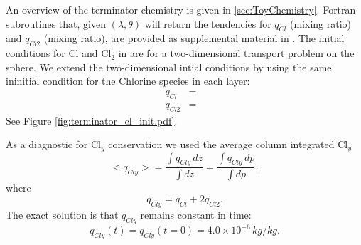 \documentclass[times,doublespace]{fldauth}
\begin{document}
An overview of the terminator chemistry is given in \ref{sec:ToyChemistry}. Fortran subroutines that, given $(\lambda,\theta)$ will return the tendencies for $q_{Cl}$ (mixing ratio) and $q_{Cl2}$ (mixing ratio), are provided as supplemental material in \cite{LCLVT2015GMD}. The initial conditions for Cl and Cl$_2$ in \cite{LCLVT2015GMD} are for a two-dimensional transport problem on the sphere. We extend the two-dimensional intial conditions by using the same ininitial condition for the Chlorine species in each layer:
\begin{eqnarray}
q_{Cl}&=& \\
q_{Cl2}&=&
\end{eqnarray}
See Figure \ref{fig:terminator_cl_init.pdf}.

As a diagnostic for Cl$_y$ conservation we used the average column integrated Cl$_y$
\begin{equation}
<q_{Cly}>=\frac{\int q_{Cly}\, dz}{\int dz}=\frac{\int q_{Cly}\, dp}{\int dp},
\end{equation}
where
\begin{equation}
q_{Cly}=q_{Cl}+2q_{Cl2}.
\end{equation}
The exact solution is that $q_{Cly}$ remains constant in time:
\begin{equation}
q_{Cly}(t)=q_{Cly}(t=0)=4.0\times 10^{-6}\, kg/kg.
\end{equation}
\end{document}
